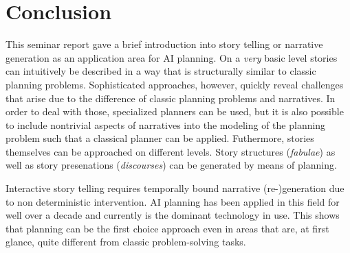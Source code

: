 \section{Conclusion}\label{conclusion}
This seminar report gave a brief introduction into story telling or narrative generation as an application area for AI planning. On a \emph{very} basic level stories can intuitively be described in a way that is structurally similar to classic planning problems. Sophisticated approaches, however, quickly reveal challenges that arise due to the difference of classic planning problems and narratives. In order to deal with those, specialized planners can be used, but it is also possible to include nontrivial aspects of narratives into the modeling of the planning problem such that a classical planner can be applied. Futhermore, stories themselves can be approached on different levels. Story structures (\emph{fabulae}) as well as story presenations (\emph{discourses}) can be generated by means of planning.

Interactive story telling requires temporally bound narrative \mbox{(re-)}generation due to non deterministic intervention. AI planning has been applied in this field for well over a decade and currently is the dominant technology in use\cite{Porteous10}. This shows that planning can be the first choice approach even in areas that are, at first glance, quite different from classic problem-solving tasks. %

